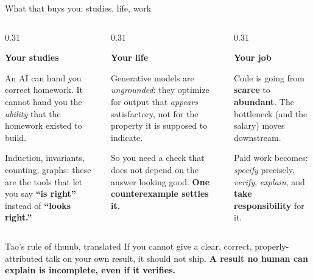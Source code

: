 \documentclass[10pt]{beamer}
\begin{document}
\begin{frame}{What that buys you: studies, life, work}

\begin{columns}[T,onlytextwidth]
\begin{column}{0.31\textwidth}
{\centering\textbf{\alert{Your studies}}\par}
\vspace{0.4em}
{\scriptsize\raggedright
An AI can hand you correct homework. It cannot hand you the \emph{ability} that the homework existed to build.

\vspace{0.4em}
Induction, invariants, counting, graphs: these are the tools that let you say \textbf{``is right''} instead of \textbf{``looks right.''}\par}
\end{column}
\pause
\begin{column}{0.31\textwidth}
{\centering\textbf{\alert{Your life}}\par}
\vspace{0.4em}
{\scriptsize\raggedright
Generative models are \emph{ungrounded}: they optimize for output that \emph{appears} satisfactory, not for the property it is supposed to indicate.

\vspace{0.4em}
So you need a check that does not depend on the answer looking good. \textbf{One counterexample settles it.}\par}
\end{column}
\pause
\begin{column}{0.31\textwidth}
{\centering\textbf{\alert{Your job}}\par}
\vspace{0.4em}
{\scriptsize\raggedright
Code is going from \textbf{scarce} to \textbf{abundant}. The bottleneck (and the salary) moves downstream.

\vspace{0.4em}
Paid work becomes: \emph{specify} precisely, \emph{verify}, \emph{explain}, and \textbf{take responsibility} for it.\par}
\end{column}
\end{columns}

\pause
\vfill
\begin{exampleblock}{Tao's rule of thumb, translated}
\small
If you cannot give a clear, correct, properly-attributed talk on your own result, it should not ship.
\textbf{A result no human can explain is incomplete, even if it verifies.}
\end{exampleblock}


\end{frame}
\end{document}
